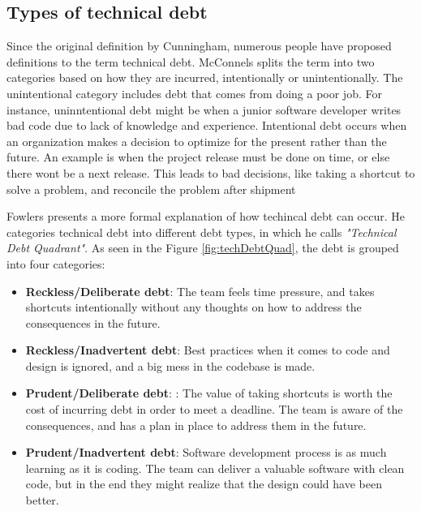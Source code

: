 \subsection{Types of technical debt}
Since the original definition by Cunningham, numerous people have proposed definitions to the term technical debt. McConnels splits the term into two categories based on how they are incurred, intentionally or unintentionally\cite{url-mcconnell}. The unintentional category includes debt that comes from doing a poor job. For instance, uninntentional debt might be when a junior software developer writes bad code due to lack of knowledge and experience. Intentional debt occurs when an organization makes a decision to optimize for the present rather than the future. An example is when the project release must be done on time, or else there wont be a next release. This leads to bad decisions, like taking a shortcut to solve a problem, and reconcile the problem after shipment

Fowlers presents a more formal explanation of how techincal debt can occur\cite{url-fowler}. He categories technical debt into different debt types, in which he calls \textit{"Technical Debt Quadrant"}. As seen in the Figure \ref{fig:techDebtQuad}, the debt is grouped into four categories: 

\begin{itemize}
	\item \textbf{Reckless/Deliberate debt}: The team feels time pressure, and takes shortcuts intentionally without any thoughts on how to address the consequences in the future.
	\item \textbf{Reckless/Inadvertent debt}: Best practices when it comes to code and design is ignored, and a big mess in the codebase is made.
	\item \textbf{Prudent/Deliberate debt}: : The value of taking shortcuts is worth the cost of incurring debt in order to meet a deadline. The team is aware of the consequences, and has a plan in place to address them in the future. 
	\item \textbf{Prudent/Inadvertent debt}: Software development process is as much learning as it is coding. The team can deliver a valuable software with clean code, but in the end they might realize that the design could have been better.
\end{itemize}

